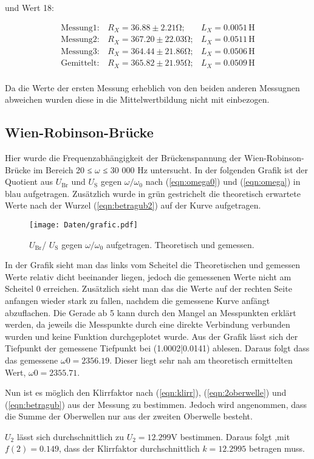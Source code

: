 und Wert 18:

\begin{align*}
\text{Messung}1:& R_X = 36.88  \pm 2.21  \si{\ohm};& L_X =  0.0051 \, \si{\henry}\\
\text{Messung}2:& R_X = 367.20 \pm 22.03 \si{\ohm};& L_X =  0.0511 \, \si{\henry}\\
\text{Messung}3:& R_X = 364.44 \pm 21.86 \si{\ohm};& L_X =  0.0506 \, \si{\henry}\\
\text{Gemittelt}:& R_X= 365.82 \pm 21.95 \si{\ohm};& L_X =  0.0509 \, \si{\henry}\\
\end{align*}

Da die Werte der ersten Messung erheblich von den beiden anderen Messugnen abweichen wurden diese in die Mittelwertbildung nicht mit einbezogen.


\subsection{Wien-Robinson-Brücke}

Hier wurde die Frequenzabhängigkeit der Brückenspannung der Wien-Robinson-Brücke im Bereich 20 ≤ $\omega$ ≤ 30 000 Hz untersucht. 
In der folgenden Grafik ist der Quotient aus $U_\text{Br}$ und $U_\text{S}$ gegen $\omega/\omega_0$ nach (\ref{eqn:omega0}) und (\ref{eqn:omega}) in blau aufgetragen.
Zusätzlich wurde in grün gestrichelt die theoretisch erwartete Werte nach der Wurzel (\ref{eqn:betragub2}) auf der Kurve aufgetragen.
\begin{figure}
    \centering
    \texttt{[image: Daten/grafic.pdf]}
    \caption{$U_\text{Br}$/ $U_\text{S}$ gegen $\omega/\omega_0$ aufgetragen. Theoretisch und gemessen.}
\end{figure}

In der Grafik sieht man das links vom Scheitel die Theoretischen und gemessen Werte relativ dicht beeinander liegen, jedoch die gemessenen Werte nicht am Scheitel 0 erreichen. Zusätzlich
sieht man das die Werte auf der rechten Seite anfangen wieder stark zu fallen, nachdem die gemessene Kurve anfängt abzuflachen. Die Gerade ab 5 kann durch den Mangel an Messpunkten
erklärt werden, da jeweils die Messpunkte durch eine direkte Verbindung verbunden wurden und keine Funktion durchgeplotet wurde.
Aus der Grafik lässt sich der Tiefpunkt der gemessene Tiefpunkt bei (1.0002|0.0141) ablesen. 
Daraus folgt dass das gemessene $\omega0 = 2356.19$. Dieser liegt sehr nah am theoretisch ermittelten Wert, $\omega0 = 2355.71$. 

Nun ist es möglich den Klirrfaktor nach (\ref{eqn:klirr}), (\ref{eqn:2oberwelle}) und (\ref{eqn:betragub}) aus der Messung zu bestimmen. Jedoch wird angenommen, 
dass die Summe der Oberwellen nur aus der zweiten Oberwelle besteht.

$U_2$ lässt sich durchschnittlich zu $U_2 = 12.299 \si{\volt}$ bestimmen. Daraus folgt ,mit $f(2) = 0.149$, dass der Klirrfaktor durchschnittlich $k = 12.2995$ betragen muss.
